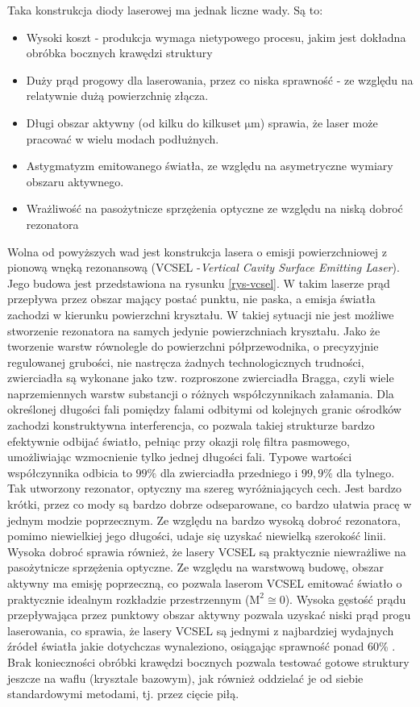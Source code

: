 \documentclass[a4paper,10pt]{article}
\begin{document}
Taka konstrukcja diody laserowej ma jednak liczne wady. Są to:
\begin{itemize}
 \item Wysoki koszt - produkcja wymaga nietypowego procesu, jakim jest dokładna obróbka bocznych krawędzi struktury
 \item Duży prąd progowy dla laserowania, przez co niska sprawność - ze względu na relatywnie dużą powierzchnię złącza.
 \item Długi obszar aktywny (od kilku do kilkuset $\mathrm{\mu m}$) sprawia, że laser może pracować w wielu modach podłużnych.
 \item Astygmatyzm emitowanego światła, ze względu na asymetryczne wymiary obszaru aktywnego.
 \item Wrażliwość na pasożytnicze sprzężenia optyczne ze względu na niską dobroć rezonatora
\end{itemize}

Wolna od powyższych wad jest konstrukcja lasera o emisji powierzchniowej z pionową wnęką rezonansową (VCSEL -\textit{Vertical Cavity Surface Emitting Laser}). Jego budowa jest przedstawiona na rysunku \ref{rys-vcsel}. W takim laserze prąd przepływa przez obszar mający postać punktu, nie paska, a emisja światła zachodzi w kierunku powierzchni kryształu. W takiej sytuacji nie jest możliwe stworzenie rezonatora na samych jedynie powierzchniach kryształu. Jako że tworzenie warstw równolegle do powierzchni półprzewodnika, o precyzyjnie regulowanej grubości, nie nastręcza żadnych technologicznych trudności, zwierciadła są wykonane jako tzw. rozproszone zwierciadła Bragga, czyli wiele naprzemiennych warstw substancji o różnych współczynnikach załamania. Dla określonej długości fali pomiędzy falami odbitymi od kolejnych granic ośrodków zachodzi konstruktywna interferencja, co pozwala takiej strukturze bardzo efektywnie odbijać światło, pełniąc przy okazji rolę filtra pasmowego, umożliwiając wzmocnienie tylko jednej długości fali. Typowe wartości współczynnika odbicia to $99\%$ dla zwierciadła przedniego i $99{,}9\%$ dla tylnego. Tak utworzony rezonator, optyczny ma szereg wyróżniających cech. Jest bardzo krótki, przez co mody są bardzo dobrze odseparowane, co bardzo ułatwia pracę w jednym modzie poprzecznym. Ze względu na bardzo wysoką dobroć rezonatora, pomimo niewielkiej jego długości, udaje się uzyskać niewielką szerokość linii. Wysoka dobroć sprawia również, że lasery VCSEL są praktycznie niewrażliwe na pasożytnicze sprzężenia optyczne.
Ze względu na warstwową budowę, obszar aktywny ma emisję poprzeczną, co pozwala laserom VCSEL emitować światło o praktycznie idealnym rozkładzie przestrzennym ($\mathrm{M^2} \cong 0$). Wysoka gęstość prądu przepływająca przez punktowy obszar aktywny pozwala uzyskać niski prąd progu laserowania, co sprawia, że lasery VCSEL są jednymi z najbardziej wydajnych źródeł światła jakie dotychczas wynaleziono, osiągając sprawność ponad 60\% \cite{spie}. Brak konieczności obróbki krawędzi bocznych pozwala testować gotowe struktury jeszcze na waflu (krysztale bazowym), jak również oddzielać je od siebie standardowymi metodami, tj. przez cięcie piłą. 
\end{document}
